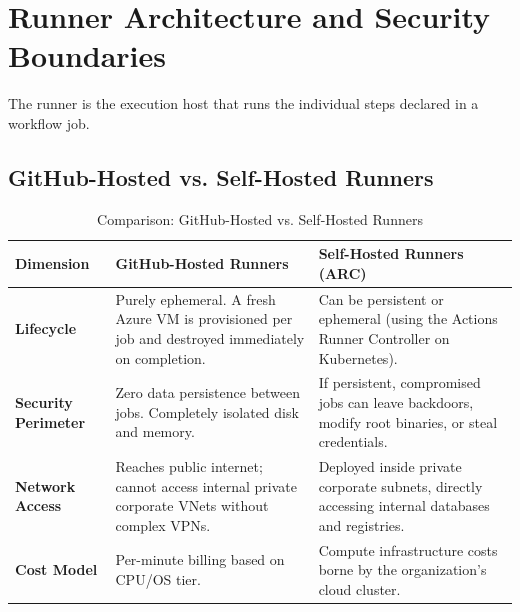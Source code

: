 \section{Runner Architecture and Security Boundaries}

The runner is the execution host that runs the individual steps declared in a workflow job.

\subsection{GitHub-Hosted vs. Self-Hosted Runners}
\begin{table}[htbp]
\centering\small
\begin{tabular}{lp{6.2cm}p{6.2cm}}
\toprule
\textbf{Dimension} & \textbf{GitHub-Hosted Runners} & \textbf{Self-Hosted Runners (ARC)} \\
\midrule
\textbf{Lifecycle} & Purely ephemeral. A fresh Azure VM is provisioned per job and destroyed immediately on completion. & Can be persistent or ephemeral (using the Actions Runner Controller on Kubernetes). \\
\textbf{Security Perimeter} & Zero data persistence between jobs. Completely isolated disk and memory. & If persistent, compromised jobs can leave backdoors, modify root binaries, or steal credentials. \\
\textbf{Network Access} & Reaches public internet; cannot access internal private corporate VNets without complex VPNs. & Deployed inside private corporate subnets, directly accessing internal databases and registries. \\
\textbf{Cost Model} & Per-minute billing based on CPU/OS tier. & Compute infrastructure costs borne by the organization's cloud cluster. \\
\bottomrule
\end{tabular}
\caption{Comparison: GitHub-Hosted vs. Self-Hosted Runners}
\label{tab:runner-types}
\end{table}

